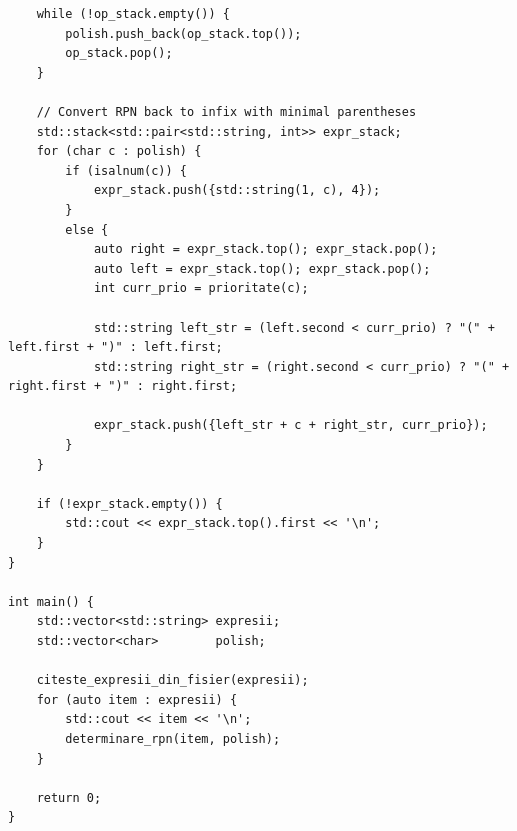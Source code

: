 \documentclass[12pt]{book}
\begin{document}
\begin{lstlisting}
    while (!op_stack.empty()) {
        polish.push_back(op_stack.top());
        op_stack.pop();
    }

    // Convert RPN back to infix with minimal parentheses
    std::stack<std::pair<std::string, int>> expr_stack;
    for (char c : polish) {
        if (isalnum(c)) {
            expr_stack.push({std::string(1, c), 4});
        }
        else {
            auto right = expr_stack.top(); expr_stack.pop();
            auto left = expr_stack.top(); expr_stack.pop();
            int curr_prio = prioritate(c);
            
            std::string left_str = (left.second < curr_prio) ? "(" + left.first + ")" : left.first;
            std::string right_str = (right.second < curr_prio) ? "(" + right.first + ")" : right.first;
            
            expr_stack.push({left_str + c + right_str, curr_prio});
        }
    }
    
    if (!expr_stack.empty()) {
        std::cout << expr_stack.top().first << '\n';
    }
}

int main() {
    std::vector<std::string> expresii;
    std::vector<char>        polish;

    citeste_expresii_din_fisier(expresii);
    for (auto item : expresii) {
        std::cout << item << '\n';
        determinare_rpn(item, polish);
    }

    return 0;
}
\end{lstlisting}

\newpage
\end{document}

